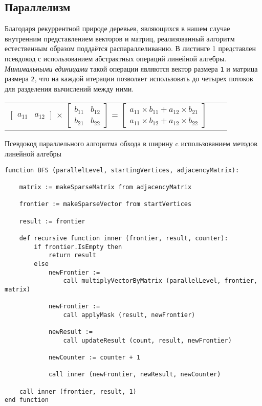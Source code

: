 \subsection{Параллелизм}
Благодаря рекуррентной природе деревьев, являющихся в нашем случае внутренним представлением векторов и матриц, реализованный алгоритм естественным образом поддаётся распараллеливанию. В листинге 1 представлен псевдокод с использованием абстрактных операций линейной алгебры. \textit{Минимальными единицами} такой операции являются вектор размера \texttt{1} и матрица размера \texttt{2}, что на каждой итерации позволяет использовать до четырех потоков для разделения вычислений между ними.
\begin{center}
    \begin{tabular}{ccc}
        $\begin{bmatrix} a_{11} & a_{12} \end{bmatrix}$
        $\times$
        $\begin{bmatrix} b_{11} & b_{12} \\ b_{21} & b_{22} \end{bmatrix}$
        =
        $\begin{bmatrix} a_{11} \times b_{11} + a_{12} \times b_{21} \\ a_{11} \times b_{12} + a_{12} \times b_{22} \end{bmatrix}$
    \end{tabular}
\end{center}

\lstset{style=codelistingstyle}

\begin{algorithm}[ht]
\caption{Псевдокод параллельного алгоритма обхода в ширину c использованием методов линейной алгебры}
\label{alg:bfs_example}
\begin{lstlisting}[language=pseudoFSharp]
function BFS (parallelLevel, startingVertices, adjacencyMatrix):

    matrix := makeSparseMatrix from adjacencyMatrix
    
    frontier := makeSparseVector from startVertices
    
    result := frontier

    def recursive function inner (frontier, result, counter):
        if frontier.IsEmpty then
            return result
        else
            newFrontier :=
                call multiplyVectorByMatrix (parallelLevel, frontier, matrix)
                
            newFrontier :=
                call applyMask (result, newFrontier)

            newResult :=
                call updateResult (count, result, newFrontier)

            newCounter := counter + 1
            
            call inner (newFrontier, newResult, newCounter)

    call inner (frontier, result, 1)
end function
\end{lstlisting}
\end{algorithm}

